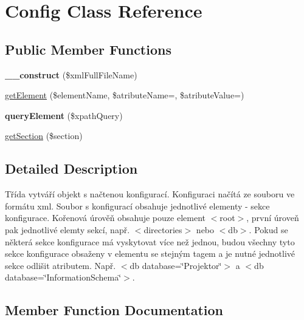 \hypertarget{class_pes_1_1_config_1_1_config}{}\section{Config Class Reference}
\label{class_pes_1_1_config_1_1_config}
\subsection*{Public Member Functions}
\begin{DoxyCompactItemize}
\item 
\mbox{\label{class_pes_1_1_config_1_1_config_adef937c6028e2bd19a29d69b818909ef}} 
{\bfseries \+\_\+\+\_\+construct} (\$xml\+Full\+File\+Name)
\item 
\mbox{\hyperlink{class_pes_1_1_config_1_1_config_afb39046d4d674fe9e6eaeb70c9f68917}{get\+Element}} (\$element\+Name, \$atribute\+Name=\textquotesingle{}\textquotesingle{}, \$atribute\+Value=\textquotesingle{}\textquotesingle{})
\item 
\mbox{\label{class_pes_1_1_config_1_1_config_a0132586da9e016d05f6c09595bd54124}} 
{\bfseries query\+Element} (\$xpath\+Query)
\item 
\mbox{\hyperlink{class_pes_1_1_config_1_1_config_a69b8f6a56f006f65cdfdb8a8884eb420}{get\+Section}} (\$section)
\end{DoxyCompactItemize}


\subsection{Detailed Description}
Třída vytváří objekt s načtenou konfigurací. Konfiguraci načítá ze souboru ve formátu xml. Soubor s konfigurací obsahuje jednotlivé elementy -\/ sekce konfigurace. Kořenová úrověň obsahuje pouze element $<$root$>$, první úroveň pak jednotlivé elemty sekcí, např. $<$directories$>$ nebo $<$db$>$. Pokud se některá sekce konfigurace má vyskytovat více než jednou, budou všechny tyto sekce konfigurace obsaženy v elementu se stejným tagem a je nutné jednotlivé sekce odlišit atributem. Např. $<$db database=\char`\"{}\+Projektor\char`\"{}$>$ a $<$db database=\char`\"{}\+Information\+Schema\char`\"{}$>$. 

\subsection{Member Function Documentation}
\mbox{\label{class_pes_1_1_config_1_1_config_afb39046d4d674fe9e6eaeb70c9f68917}} 
